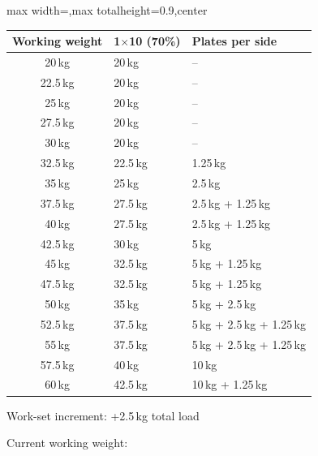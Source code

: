 \documentclass[11pt,a4paper]{article}
\newcommand{\tablearraystretch}{1.15}
\begin{document}
\begin{center}
\renewcommand{\arraystretch}{\tablearraystretch}
\begin{adjustbox}{max width=\linewidth,max totalheight=0.9\textheight,center}
\begin{tabular}{cll}
\toprule
Working weight & 1$\times$10 (70\%) & Plates per side \\
\midrule
20\,kg   & 20\,kg   & -- \\
22.5\,kg & 20\,kg   & -- \\
25\,kg   & 20\,kg   & -- \\
27.5\,kg & 20\,kg   & -- \\
30\,kg   & 20\,kg   & -- \\
32.5\,kg & 22.5\,kg & 1.25\,kg \\
35\,kg   & 25\,kg   & 2.5\,kg \\
37.5\,kg & 27.5\,kg & 2.5\,kg + 1.25\,kg \\
40\,kg   & 27.5\,kg & 2.5\,kg + 1.25\,kg \\
42.5\,kg & 30\,kg   & 5\,kg \\
45\,kg   & 32.5\,kg & 5\,kg + 1.25\,kg \\
47.5\,kg & 32.5\,kg & 5\,kg + 1.25\,kg \\
50\,kg   & 35\,kg   & 5\,kg + 2.5\,kg \\
52.5\,kg & 37.5\,kg & 5\,kg + 2.5\,kg + 1.25\,kg \\
55\,kg   & 37.5\,kg & 5\,kg + 2.5\,kg + 1.25\,kg \\
57.5\,kg & 40\,kg   & 10\,kg \\
60\,kg   & 42.5\,kg & 10\,kg + 1.25\,kg \\
\bottomrule
\end{tabular}
\end{adjustbox}
\renewcommand{\arraystretch}{1}
\end{center}

Work-set increment: +2.5\,kg total load

Current working weight:
\end{document}

